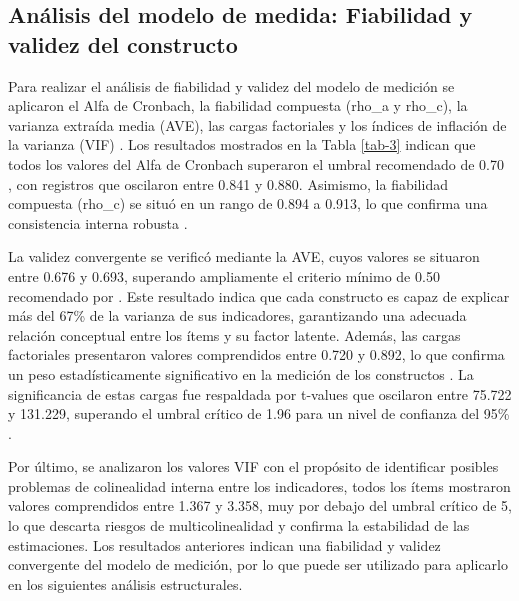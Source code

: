 \documentclass[spanish]{textolivre}
\begin{document}
\subsection{Análisis del modelo de medida: Fiabilidad y validez del constructo}
Para realizar el análisis de fiabilidad y validez del modelo de medición se aplicaron el Alfa de Cronbach, la fiabilidad compuesta (rho\_a y rho\_c), la varianza extraída media (AVE), las cargas factoriales y los índices de inflación de la varianza (VIF) \cite{hair2022}. Los resultados mostrados en la Tabla \ref{tab-3} indican que todos los valores del Alfa de Cronbach superaron el umbral recomendado de 0.70 \cite{devellis2021}, con registros que oscilaron entre 0.841 y 0.880. Asimismo, la fiabilidad compuesta (rho\_c) se situó en un rango de 0.894 a 0.913, lo que confirma una consistencia interna robusta \cite{fornell1981}.

La validez convergente se verificó mediante la AVE, cuyos valores se situaron entre 0.676 y 0.693, superando ampliamente el criterio mínimo de 0.50 recomendado por \cite{aburumman2023}. Este resultado indica que cada constructo es capaz de explicar más del 67\% de la varianza de sus indicadores, garantizando una adecuada relación conceptual entre los ítems y su factor latente. Además, las cargas factoriales presentaron valores comprendidos entre 0.720 y 0.892, lo que confirma un peso estadísticamente significativo en la medición de los constructos \cite{henseler2015}. La significancia de estas cargas fue respaldada por t-values que oscilaron entre 75.722 y 131.229, superando el umbral crítico de 1.96 para un nivel de confianza del 95\% \cite{cheung2024}.

Por último, se analizaron los valores VIF con el propósito de identificar posibles problemas de colinealidad interna entre los indicadores, todos los ítems mostraron valores comprendidos entre 1.367 y 3.358, muy por debajo del umbral crítico de 5, lo que descarta riesgos de multicolinealidad y confirma la estabilidad de las estimaciones. Los resultados anteriores indican una fiabilidad y validez convergente del modelo de medición, por lo que puede ser utilizado para aplicarlo en los siguientes análisis estructurales.
\end{document}

